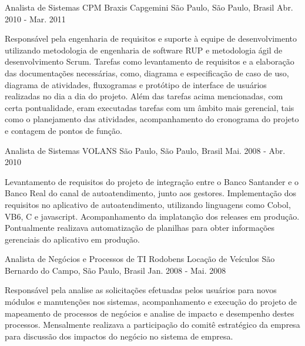 \begin{cventries}
  \cventry
    {Analista de Sistemas} %
    {CPM Braxis Capgemini} %
    {São Paulo, São Paulo, Brasil} %
    {Abr. 2010 - Mar. 2011} %
    {
      \begin{cvitems} %
        \item {Responsável pela engenharia de requisitos e suporte à equipe de desenvolvimento utilizando metodologia de engenharia de software RUP e metodologia ágil de desenvolvimento Scrum. Tarefas como levantamento de requisitos e a elaboração das documentações necessárias, como, diagrama e especificação de caso de uso, diagrama de atividades, fluxogramas e protótipo de interface de usuários realizadas no dia a dia do projeto. Além das tarefas acima mencionadas, com certa pontualidade, eram executadas tarefas com um âmbito mais gerencial, tais como o planejamento das atividades, acompanhamento do cronograma do projeto e contagem de pontos de função.}
      \end{cvitems}
    }

  \cventry
    {Analista de Sistemas} %
    {VOLANS} %
    {São Paulo, São Paulo, Brasil} %
    {Mai. 2008 - Abr. 2010} %
    {
      \begin{cvitems} %
        \item {Levantamento de requisitos do projeto de integração entre o Banco Santander e o Banco Real do canal de autoatendimento, junto aos gestores. Implementação dos requisitos no aplicativo de autoatendimento, utilizando linguagens como Cobol, VB6, C e javascript. Acompanhamento da implatanção dos releases em produção. Pontualmente realizava automatização de planilhas para obter informações gerenciais do aplicativo em produção.}
      \end{cvitems}
    }

  \cventry
    {Analista de Negócios e Processos de TI} %
    {Rodobens Locação de Veículos} %
    {São Bernardo do Campo, São Paulo, Brasil} %
    {Jan. 2008 - Mai. 2008} %
    {
      \begin{cvitems} %
        \item {Responsável pela analise as solicitações efetuadas pelos usuários para novos módulos e manutenções nos sistemas, acompanhamento e execução do projeto de mapeamento de processos de negócios e analise de impacto e desempenho destes processos. Mensalmente realizava a participação do comitê estratégico da empresa para discussão dos impactos do negócio no sistema de empresa.}
      \end{cvitems}
    }


\end{cventries}

